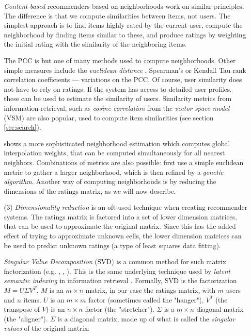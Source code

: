 \emph{Content-based} recommenders based on neighborhoods work on similar principles.
The difference is that we compute similarities between items, not users. The simplest
approach is to find items highly rated by the current user, compute the neighborhood 
by finding items similar to these, and produce ratings by weighting the initial rating
with the similarity of the neighboring items.

The PCC is but one of many methods used to compute neighborhoods. 
Other simple measures include the \emph{euclidean distance} \cite[p10]{Segaran2007},
Spearman's or Kendall Tau rank correlation coefficients \cite[p30]{Herlocker2004} --- 
variations on the PCC.
Of course, user similarity does not have to rely on ratings. 
If the system has access to detailed user profiles, these can be used
to estimate the similarity of users.
Similarity metrics from information retrieval,
such as \emph{cosine correlation} from the \emph{vector space model} (VSM) are also popular,
used to compute item similarities (see section \ref{sec:search}).

\cite{Bell2007a} shows a more sophisticated neighborhood estimation which computes global interpolation weights,
that can be computed simultaneously for all nearest neighbors.
Combinations of metrics are also possible: 
\cite{Ujjin} first use a simple euclidean metric to gather a larger neighborhood, which is then refined
by a \emph{genetic algorithm}.
Another way of computing neighborhoods is by reducing the dimensions of the ratings matrix,
as we will now describe.


(3) \emph{Dimensionality reduction} is an oft-used technique when creating recommender systems.
The ratings matrix is factored into a set of lower dimension matrices, that can be used to approximate the original matrix.
Since this has the added effect of trying to approximate unknown cells, the lower dimension matrices
can be used to predict unknown ratings (a type of least squares data fitting).

\emph{Singular Value Decomposition} (SVD) is a common method for such matrix factorization (e.g. \citet[p5]{Billsus}, \citet{Sun2005}, \citet{Bell2007}).  
This is the same underlying technique used by \emph{latent semantic indexing} in information retrieval \cite[p44]{Baeza-Yates1999}.
Formally, SVD is the factorization $M = U \Sigma V^{T}$. 
$M$ is an $m \times n$ matrix, in our case the ratings matrix, with $m$ users and $n$ items. 
$U$ is an $m \times m$ factor (sometimes called the "hanger"), $V^{T}$ (the transpose of $V$) is an $n \times n$ factor (the "stretcher").
$\Sigma$ is a $m \times n$ diagonal matrix (the "aligner"). 
$\Sigma$ is a diagonal matrix, made up of what is called the \emph{singular values} of the original matrix.

